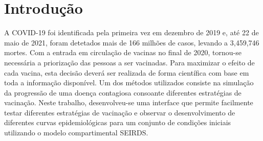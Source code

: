 \section{Introdução}
A COVID-19 foi identificada pela primeira vez em dezembro de 2019 e, até 22 de maio de 2021, foram detetados mais de 166 milhões de casos, levando a 3,459,746 mortes.
Com a entrada em circulação de vacinas no final de 2020, tornou-se necessária a priorização das pessoas a ser vacinadas.
Para maximizar o efeito de cada vacina, esta decisão deverá ser realizada de forma científica com base em toda a informação disponível.
Um dos métodos utilizados consiste na simulação da progressão de uma doença contagiosa consoante diferentes estratégias de vacinação.
Neste trabalho, desenvolveu-se uma interface que permite facilmente testar diferentes estratégias de vacinação e observar o desenvolvimento de diferentes curvas epidemiológicas para um conjunto de condições iniciais utilizando o modelo compartimental SEIRDS.


